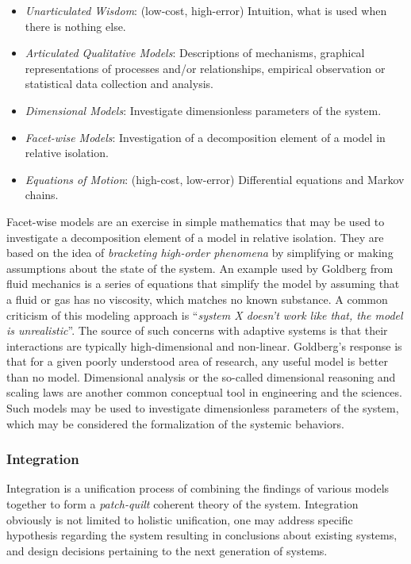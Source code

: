 \documentclass[a4paper, 11pt]{article}
\begin{document}
\begin{itemize}
	\item \emph{Unarticulated Wisdom}: (low-cost, high-error) Intuition, what is used when there is nothing else.
	\item \emph{Articulated Qualitative Models}: Descriptions of mechanisms, graphical representations of processes and/or relationships, empirical observation or statistical data collection and analysis.
	\item \emph{Dimensional Models}: Investigate dimensionless parameters of the system.
	\item \emph{Facet-wise Models}: Investigation of a decomposition element of a model in relative isolation.
	\item \emph{Equations of Motion}: (high-cost, low-error) Differential equations and Markov chains.
\end{itemize}

Facet-wise models are an exercise in simple mathematics that may be used to investigate a decomposition element of a model in relative isolation. They are based on the idea of \emph{bracketing high-order phenomena} by simplifying or making assumptions about the state of the system. An example used by Goldberg from fluid mechanics is a series of equations that simplify the model by assuming that a fluid or gas has no viscosity, which matches no known substance. A common criticism of this modeling approach is ``\emph{system X doesn't work like that, the model is unrealistic}''. The source of such concerns with adaptive systems is that their interactions are typically high-dimensional and non-linear. Goldberg's response is that for a given poorly understood area of research, any useful model is better than no model. Dimensional analysis or the so-called dimensional reasoning and scaling laws are another common conceptual tool in engineering and the sciences. Such models may be used to investigate dimensionless parameters of the system, which may be considered the formalization of the systemic behaviors.

\subsubsection{Integration} 
Integration is a unification process of combining the findings of various models together to form a \emph{patch-quilt} coherent theory of the system. Integration obviously is not limited to holistic unification, one may address specific hypothesis regarding the system resulting in conclusions about existing systems, and design decisions pertaining to the next generation of systems.
\end{document}
